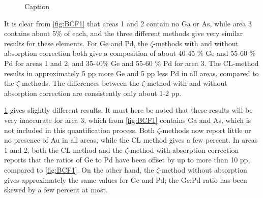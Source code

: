 \begin{figure}[h!]
\begin{subfigure}{0.7\textwidth}
		\caption{}
		\label{fig:BCF2}
	\end{subfigure}
	\caption{
		\label{fig:BCF}%
		Caption}
\end{figure}

It is clear from \cref{fig:BCF1} that areas 1 and 2 contain no Ga or As, while area 3 contains about 5\% of each, and the three different methods give very similar results for these elements. For Ge and Pd, the $\zeta$-methods with and without absorption correction both give a composition of about 40-45 \% Ge and 55-60 \% Pd for areas 1 and 2, and 35-40\% Ge and 55-60 \% Pd for area 3. The CL-method results in approximately 5 pp more Ge and 5 pp less Pd in all areas, compared to the $\zeta$-methods. The differences between the $\zeta$-method with and without absorption correction are consistently only about 1-2 pp.

\cref{fig:BCF2} gives slightly different results. It must here be noted that these results will be very inaccurate for area 3, which from \cref{fig:BCF1} contains Ga and As, which is not included in this quantification process. Both $\zeta$-methods now report little or no presence of Au in all areas, while the CL method gives a few percent. In areas 1 and 2, both the CL-method and the $\zeta$-method with absorption correction reports that the ratios of Ge to Pd have been offset by up to more than 10 pp, compared to \cref{fig:BCF1}. On the other hand, the $\zeta$-method without absorption gives approximately the same values for Ge and Pd; the Ge:Pd ratio has been skewed by a few percent at most.




